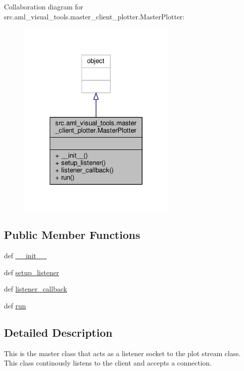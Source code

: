 Collaboration diagram for src.\-aml\-\_\-visual\-\_\-tools.\-master\-\_\-client\-\_\-plotter.\-Master\-Plotter\-:\nopagebreak
\begin{figure}[H]
\begin{center}
\leavevmode
\includegraphics[width=218pt]{classsrc_1_1aml__visual__tools_1_1master__client__plotter_1_1_master_plotter__coll__graph}
\end{center}
\end{figure}
\subsection*{Public Member Functions}
\begin{DoxyCompactItemize}
\item 
def \hyperlink{classsrc_1_1aml__visual__tools_1_1master__client__plotter_1_1_master_plotter_ae576639042e298c74a8087bb9e6783e9}{\-\_\-\-\_\-init\-\_\-\-\_\-}
\item 
def \hyperlink{classsrc_1_1aml__visual__tools_1_1master__client__plotter_1_1_master_plotter_ac0e20b548ebe5b280b5294f79c189ba3}{setup\-\_\-listener}
\item 
def \hyperlink{classsrc_1_1aml__visual__tools_1_1master__client__plotter_1_1_master_plotter_a9c42d47e7912c065006aef42f687471d}{listener\-\_\-callback}
\item 
def \hyperlink{classsrc_1_1aml__visual__tools_1_1master__client__plotter_1_1_master_plotter_abd6a89a579282e21da25ae864e5aac45}{run}
\end{DoxyCompactItemize}


\subsection{Detailed Description}
\begin{DoxyVerb}This is the master class that acts as a listener socket to
the plot stream class. This class continously listens to the 
client and accepts a connection.
\end{DoxyVerb}
 

